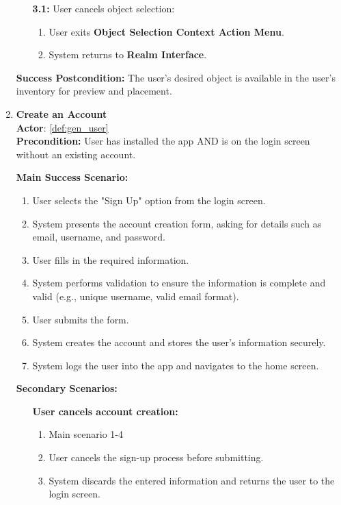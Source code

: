\documentclass{article}
\begin{document}
\begin{enumerate}[label=\textbf{UC\arabic*}]
\begin{itemize}
              \item[{\bf 3.1:}] User cancels object selection:
                    \begin{enumerate}[label=\textbf{\arabic*.}]
                        \item User exits \textbf{Object Selection Context Action Menu}.
                        \item System returns to \textbf{Realm Interface}.
                    \end{enumerate}
          \end{itemize}

          \textbf{Success Postcondition:} The user’s desired object is available in the user’s inventory for preview and placement.

    \item \label{uc:23} \textbf{Create an Account} \\
          \textbf{Actor}: \ref{def:gen_user} \\
          \textbf{Precondition:} User has installed the app AND is on the login screen without an existing account.

          \textbf{Main Success Scenario:}
          \begin{enumerate}[label=\textbf{\arabic*.}]
              \item User selects the "Sign Up" option from the login screen.
              \item System presents the account creation form, asking for details such as email, username, and password.
              \item User fills in the required information.
              \item System performs validation to ensure the information is complete and valid (e.g., unique username, valid email format).
              \item User submits the form.
              \item System creates the account and stores the user’s information securely.
              \item System logs the user into the app and navigates to the home screen.
          \end{enumerate}

          \textbf{Secondary Scenarios:}
          \begin{itemize}
              \item[{}] \textbf{User cancels account creation:}
                    \begin{enumerate}[label=\textbf{\arabic*.}]
                        \item Main scenario 1-4
                        \item User cancels the sign-up process before submitting.
                        \item System discards the entered information and returns the user to the login screen.
                    \end{enumerate}


\end{itemize}
\end{enumerate}
\end{document}
